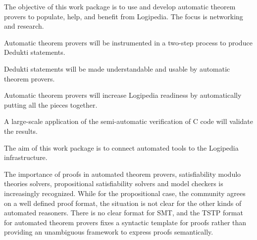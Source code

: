 \begin{workpackage}[id=atpetc,wphases=0-48,type=RTD,
  short=ATPs,%
  title={Automatic theorem provers},
  lead=Lie,
  LieRM=18,
  InnRM=6,
  PraRM=15,
  BelRM=12,
  SacRM=9,
  ImtRM=36,
  OcaRM=30,
  CeaRM=30,
  StuRM=18]


\begin{wpobjectives}
  The objective of this work package is to use and develop automatic
  theorem provers to populate, help, and benefit from Logipedia. The
  focus is networking and research.
  \begin{compactitem}
  \item Automatic theorem provers will be instrumented in a two-step
    process to produce Dedukti statements.
  \item Dedukti statements will be made understandable and usable by
    automatic theorem provers.
  \item Automatic theorem provers will increase Logipedia readiness by
    automatically putting all the pieces together.
  \end{compactitem}
  A large-scale application of the semi-automatic verification of C code
  will validate the results.
\end{wpobjectives}


\begin{wpdescription}

  The aim of this work package is to connect automated tools to the Logipedia
  infrastructure.


The importance of proofs in automated theorem provers, satisfiability
modulo theories solvers, propositional satisfiability solvers and
model checkers is increasingly recognized.  While for the
propositional case, the community agrees on a well defined proof
format, the situation is not clear for the other kinds of automated
reasoners.  There is no clear format for SMT, and the TSTP format for
automated theorem provers fixes a syntactic template for proofs rather
than providing an unambiguous framework to express proofs
semantically.


\end{wpdescription}
\end{workpackage}
